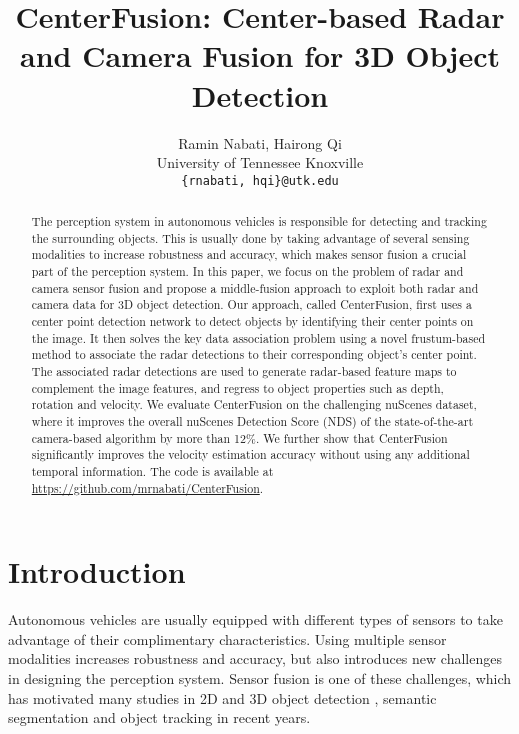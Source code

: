 \documentclass[10pt,twocolumn,letterpaper]{article}
\newcommand\method{CenterFusion}
\begin{document}
\title{CenterFusion: Center-based Radar and Camera Fusion for 3D Object Detection}

\author{Ramin Nabati, Hairong Qi\\
University of Tennessee Knoxville\\
{\tt\small \{rnabati, hqi\}@utk.edu}
}

\maketitle

\begin{abstract}
   The perception system in autonomous vehicles is responsible for detecting and 
   tracking the surrounding objects. This is usually done by taking advantage of 
   several sensing modalities to increase robustness and accuracy, which makes 
   sensor fusion a crucial part of the perception system. In this paper, we focus on 
   the problem of radar and camera sensor fusion and propose a middle-fusion approach 
   to exploit both radar and camera data for 3D object detection. Our approach,
   called \method{}, first uses a center point detection network to detect objects 
   by identifying their center points on the image. It then solves the key data association problem using a novel frustum-based 
   method to associate the radar detections to their corresponding object's center 
   point. The associated 
   radar detections are used to generate radar-based feature maps to complement the 
   image features, and regress to object properties such as depth, rotation and 
   velocity. We evaluate CenterFusion on the challenging nuScenes dataset, where it improves 
   the overall nuScenes Detection Score (NDS) of the state-of-the-art camera-based 
   algorithm by more than 12\%. We further show that CenterFusion significantly
   improves the velocity estimation accuracy without using any additional 
   temporal information. The code is available at 
   \href{https://github.com/mrnabati/CenterFusion}{https://github.com/mrnabati/CenterFusion}.
   
   \end{abstract}
   
   \section{Introduction}
   Autonomous vehicles are usually equipped with different types of sensors 
   to take advantage of their complimentary characteristics.
   Using multiple sensor modalities increases robustness and accuracy, but also
   introduces new challenges in designing the perception system. Sensor fusion is 
   one of these challenges, which has motivated many studies in 2D and 3D object
   detection \cite{Chen_2017, Ku_2018,Liang_2019_CVPR,Nabati_2019}, semantic
   segmentation \cite{7139439,Meyer_2019} and object tracking
   \cite{7795718,fang2019camera} in recent years.
   
\end{document}

